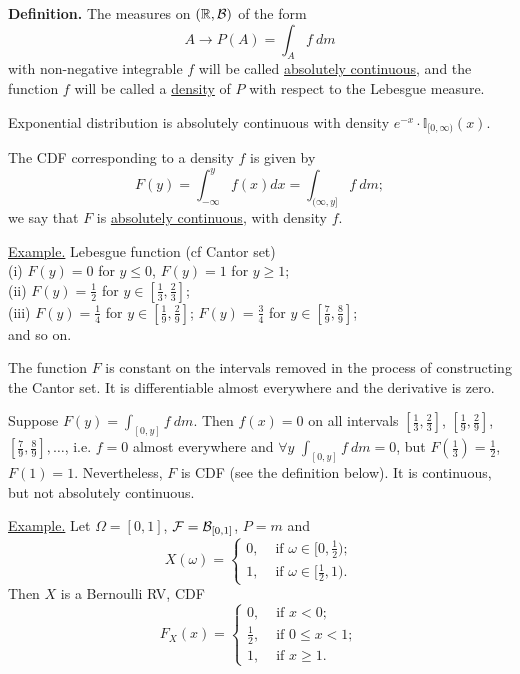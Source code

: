 \documentclass[a4paper,10pt]{article}
\def\RR{\mathbb{R}}
\def\II{\mathbb{I}}
\newcommand{\1}[1]{\mathbf{1}_{\{#1\}}}
\begin{document}
{\bf Definition.} The measures on $(\RR,{\cal B})$ of the form
  $$A\to P(A)=\int_A f~dm$$
with non-negative integrable $f$ will be called \underline{absolutely continuous}, and the function $f$ will be called a \underline{density} of $P$ with respect to the Lebesgue measure.

Exponential distribution is absolutely continuous with density $e^{-x}\cdot\II_{[0,\infty)}(x)$.

The CDF corresponding to a density $f$ is given by
  $$F(y)=\int_{-\infty}^y f(x)dx=\int_{(\infty,y]} f~dm;$$
we say that $F$ is \underline{absolutely continuous}, with density $f$.
\vspace{3mm}

\underline{Example.} Lebesgue function (cf Cantor set)\\
(i) $F(y)=0$ for $y\le 0$, $F(y)=1$ for $y\ge 1$;\\
(ii) $F(y)=\frac{1}{2}$ for $y\in[\frac{1}{3},\frac{2}{3}]$;\\
(iii) $F(y)=\frac{1}{4}$ for $y\in[\frac{1}{9},\frac{2}{9}]$; $F(y)=\frac{3}{4}$ for $y\in[\frac{7}{9},\frac{8}{9}]$;\\
and so on. \vspace{5cm}

The function $F$ is constant on the intervals removed in the process of constructing the Cantor set. It is differentiable almost everywhere and the derivative is zero.

Suppose $F(y)=\int_{[0,y]} f~dm$. Then $f(x)=0$ on all intervals $[\frac{1}{3},\frac{2}{3}]$, $[\frac{1}{9},\frac{2}{9}]$, $[\frac{7}{9},\frac{8}{9}],\ldots$, i.e. $f=0$ almost everywhere and $\forall y$ $\int_{[0,y]}f~ dm =0$, but $F(\frac{1}{3})=\frac{1}{2}$, $F(1)=1$. Nevertheless, $F$ is CDF (see the definition below). It is continuous, but not absolutely continuous.\vspace{3mm}

\underline{Example.}
Let $\Omega=[0,1]$, ${\cal F}={\cal B}_{[0,1]}$, $P=m$ and
  $$X(\omega)=\left\{\begin{array}{ll} 0, & \mbox{ if } \omega\in[0,\frac{1}{2}); \\ 1, & \mbox{ if } \omega\in[\frac{1}{2},1).
\end{array}\right. $$
Then $X$ is a Bernoulli RV, CDF
  $$F_X(x)=\left\{\begin{array}{ll} 0, & \mbox{ if } x<0;\\ \frac{1}{2}, & \mbox{ if } 0\le x<1; \\ 1, & \mbox{ if } x\ge 1.\end{array}\right. $$\vspace{5cm}
\end{document}
